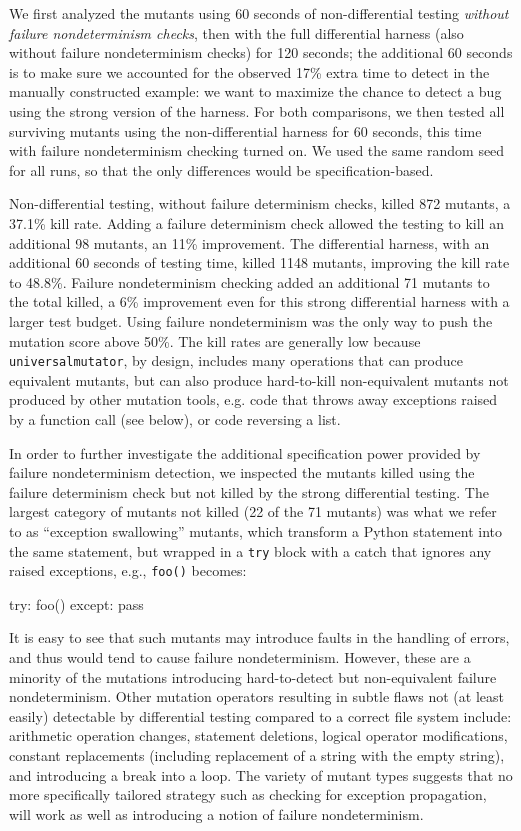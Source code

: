 We first analyzed the mutants using 60 seconds of non-differential
testing \emph{without failure nondeterminism checks}, then with the
full differential harness (also without failure nondeterminism checks)
for 120 seconds; the additional 60 seconds is to make sure we accounted for the observed 17\%
extra time to detect in the manually constructed example: we want to
maximize the chance to detect a bug using the strong version of the harness.   For both comparisons, we then tested
all surviving mutants using the non-differential harness for 60
seconds, this time with failure nondeterminism checking turned on.
We used the same random seed for
all runs, so that the only differences would be specification-based.

Non-differential testing, without failure determinism checks, killed
872 mutants, a 37.1\% kill rate.  Adding a failure determinism check
allowed the testing to kill an additional 98 mutants, an 11\% improvement.
The differential harness, with an additional 60 seconds of testing
time, killed 1148 mutants, improving the kill rate to 48.8\%.  Failure
nondeterminism checking added an
additional 71 mutants to the total killed, a 6\% improvement even for
this strong differential harness with a larger test budget.  Using
failure nondeterminism was the only way to push the mutation score
above 50\%.  The kill rates are generally low
because {\tt universalmutator}, by design, includes many operations
that can produce equivalent mutants, but can also produce hard-to-kill
non-equivalent mutants not produced by other mutation tools, e.g. code
that throws away exceptions raised by a function call (see below), or code
reversing a list.

In order to further investigate the additional specification power
provided by failure nondeterminism detection, we inspected the mutants
killed using the failure determinism check but not killed by the
strong differential testing.  The largest category of mutants not
killed (22 of the 71 mutants) was what we refer to as ``exception
swallowing'' mutants, which transform a Python statement into the same
statement, but wrapped in a {\tt try} block with a catch that ignores
any raised exceptions, e.g., {\tt foo()} becomes:

\begin{code}
try: foo()
except: pass
\end{code}

\noindent It is easy to
see that such mutants may introduce faults in the handling of
errors, and thus would tend to cause failure nondeterminism.  However,
these are a minority of the mutations introducing hard-to-detect but
non-equivalent failure
nondeterminism.  Other mutation operators resulting in subtle flaws
not (at least easily) detectable by differential testing compared to a
correct file system include:  arithmetic operation changes, statement
deletions, logical operator modifications, constant replacements
(including replacement of a string with the empty string), and
introducing a break into a loop.  The variety of mutant types suggests
that no more specifically tailored strategy such as checking for
exception propagation, will work as well as introducing a notion of
failure nondeterminism.

